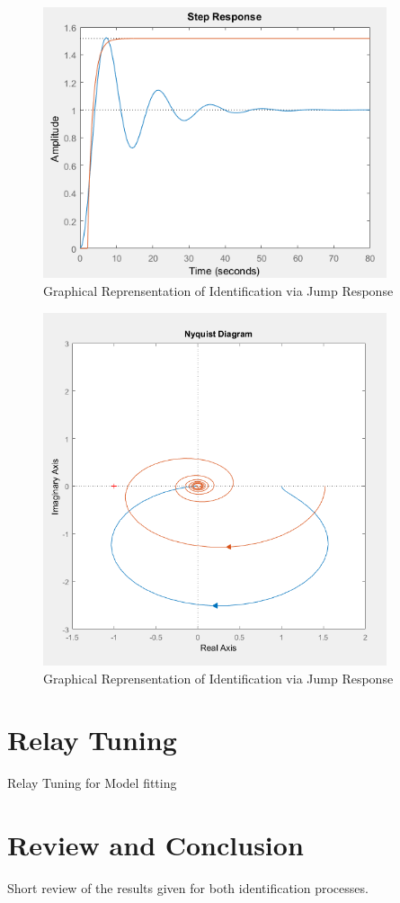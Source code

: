 \begin{figure}[H]
\begin{minipage}[b]{\textwidth}
\centering
\includegraphics[width=0.9\textwidth]{./Graphics/Overdamped_MATLAB.png}
\caption{Graphical Reprensentation of Identification via Jump Response}
\label{c:control:f:2area}
\end{minipage}
\end{figure}

\begin{figure}[H]
\begin{minipage}[b]{\textwidth}
\centering
\includegraphics[width=0.9\textwidth]{./Graphics/NYQUIST_MATLAB.png}
\caption{Graphical Reprensentation of Identification via Jump Response}
\label{c:control:f:2area}
\end{minipage}
\end{figure}


\section{Relay Tuning} %
\label{c:identification:s:relay_tuning}

Relay Tuning for Model fitting

\section{Review and Conclusion}%
\label{c:identification:s:review}

Short review of the results given for both identification processes.
